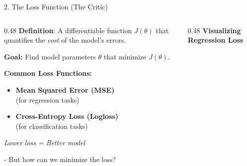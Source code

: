 \begin{frame}{2. The Loss Function (The Critic)}
    \begin{columns}[T]
        \begin{column}{0.48\textwidth}
            \textbf{Definition}: A differentiable function $J(\theta)$ that quantifies the \textit{cost} of the model's errors.
            \vspace{0.5em}
            
            \textbf{Goal:} Find model parameters $\theta$ that minimize $J(\theta)$.
            
            \vspace{0.8em}
            \textbf{Common Loss Functions:}
            \begin{itemize}
                \item \textbf{\small Mean Squared Error (MSE)}\\
                (for regression tasks)
                
                \vspace{0.3em}
                \item \textbf{\small Cross-Entropy Loss (Logloss)}\\
                (for classification tasks)
            \end{itemize}
            
            \vspace{0.5em}
            \small\textit{Lower loss = Better model}
            
            \vspace{1em}
            \small{- But how can we minimize the loss?}
        \end{column}
        
        \begin{column}{0.48\textwidth}
            \centering
            \textbf{Visualizing Regression Loss}
            
            \vspace{0.5em}
\end{column}
\end{columns}
\end{frame}
